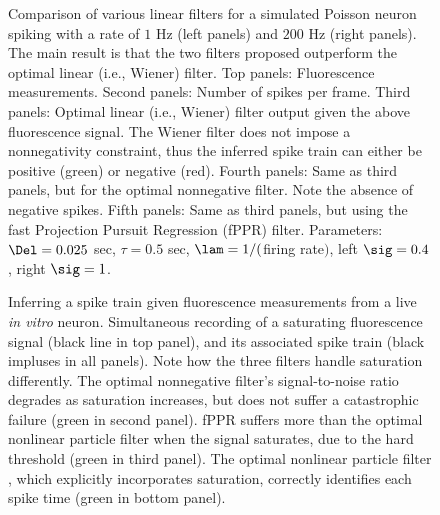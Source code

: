 \begin{figure}
\caption{Comparison of various linear filters for a simulated Poisson neuron spiking with a rate of $1$ Hz (left panels) and $200$ Hz (right panels). The main result is that the two filters proposed outperform the optimal linear (i.e., Wiener) filter. Top panels: Fluorescence measurements.  Second panels: Number of spikes per frame.  Third panels: Optimal linear (i.e., Wiener) filter output given the above fluorescence signal.  The Wiener filter does not impose a nonnegativity constraint, thus the inferred spike train can either be positive (green) or negative (red).  Fourth panels: Same as third panels, but for the optimal nonnegative filter. Note the absence of negative spikes.  Fifth panels: Same as third panels, but using the fast Projection Pursuit Regression (fPPR) filter. Parameters: $\Del=0.025$ sec, $\tau=0.5$ sec, $\lam=1/($firing rate$)$, left  $\sig=0.4$, right $\sig=1$.} \label{fig:comp}
\end{figure}

\begin{figure}[!h]
\caption{Inferring a spike train given fluorescence measurements from a live \emph{in vitro} neuron.  Simultaneous recording of a saturating fluorescence signal (black line in top panel), and its associated spike train (black impluses in all panels).  Note how the three filters handle saturation differently. The optimal nonnegative filter's signal-to-noise ratio degrades as saturation increases, but does not suffer a catastrophic failure (green in second panel). fPPR suffers more than the optimal nonlinear particle filter when the signal saturates, due to the hard threshold (green in third panel). The optimal nonlinear particle filter \cite{BJ08}, which explicitly incorporates saturation, correctly identifies each spike time (green in bottom panel).} \label{fig:real}
\end{figure}

